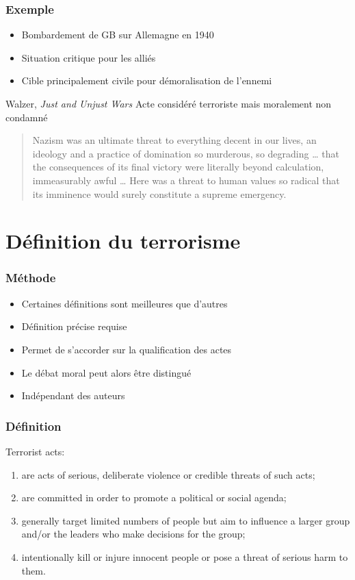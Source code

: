 \documentclass[english, french]{beamer}
\begin{document}
\begin{frame}
  \frametitle{Exemple}
  \begin{itemize}
    \item Bombardement de GB sur Allemagne en 1940
    \item Situation critique pour les alliés
    \item Cible principalement civile pour démoralisation de l’ennemi
  \end{itemize}
  \begin{block}{Walzer, \emph{Just and Unjust Wars}}
    Acte considéré terroriste mais moralement non condamné
    \vspace{2mm}\mbox{}
    \begin{quote}
      Nazism was an ultimate threat to everything decent in our lives, an ideology and a practice of domination so murderous, so degrading … that the consequences of its ﬁnal victory were literally beyond calculation, immeasurably awful … Here was a threat to human values so radical that its imminence would surely constitute a supreme emergency.
    \end{quote}
  \end{block}
\end{frame}

\section{Définition du terrorisme}
\begin{frame}
  \frametitle{Méthode}
  \begin{itemize}
    \item Certaines définitions sont meilleures que d’autres
    \item Définition précise requise
    \item Permet de s’accorder sur la qualification des actes
    \item Le débat moral peut alors être distingué
    \item Indépendant des auteurs
  \end{itemize}
\end{frame}

\begin{frame}
  \frametitle{Définition}
  Terrorist acts:
  \begin{enumerate}
    \item are acts of serious, deliberate violence or credible threats of such acts;
    \item are committed in order to promote a political or social agenda;
    \item generally target limited numbers of people but aim to inﬂuence a larger
    group and/or the leaders who make decisions for the group;
    \item intentionally kill or injure innocent people or pose a threat of serious
    harm to them.
  \end{enumerate}
\end{frame}
\end{document}
